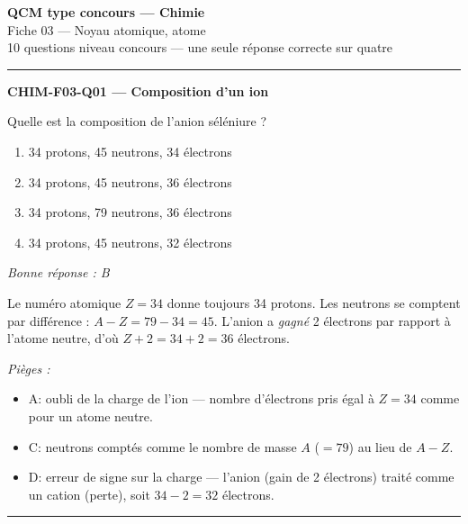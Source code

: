 \documentclass[11pt,a4paper]{article}
\begin{document}
\begin{center}
{\Large\textbf{QCM type concours --- Chimie}}\\[2pt]
{\large Fiche 03 --- Noyau atomique, atome}\\[2pt]
{\small 10 questions niveau concours --- une seule réponse correcte sur quatre}
\end{center}
\vspace{6pt}\hrule\vspace{10pt}

\noindent\textbf{CHIM-F03-Q01 --- Composition d'un ion}\par
Quelle est la composition de l'anion séléniure  ?
\begin{enumerate}[label=\Alph*)]
\item \num{34} protons, \num{45} neutrons, \num{34} électrons
\item \num{34} protons, \num{45} neutrons, \num{36} électrons
\item \num{34} protons, \num{79} neutrons, \num{36} électrons
\item \num{34} protons, \num{45} neutrons, \num{32} électrons
\end{enumerate}
\textit{Bonne réponse : B}\par
Le numéro atomique $Z=34$ donne toujours \num{34} protons. Les neutrons se comptent par différence : $A - Z = 79 - 34 = 45$. L'anion  a \emph{gagné} \num{2} électrons par rapport à l'atome neutre, d'où $Z + 2 = 34 + 2 = 36$ électrons.\par
\textit{Pièges :}
\begin{itemize}
\item A: oubli de la charge de l'ion --- nombre d'électrons pris égal à $Z=34$ comme pour un atome neutre.
\item C: neutrons comptés comme le nombre de masse $A$ ($=79$) au lieu de $A-Z$.
\item D: erreur de signe sur la charge --- l'anion (gain de \num{2} électrons) traité comme un cation (perte), soit $34-2=32$ électrons.
\end{itemize}
\vspace{8pt}\hrule\vspace{8pt}
\end{document}
